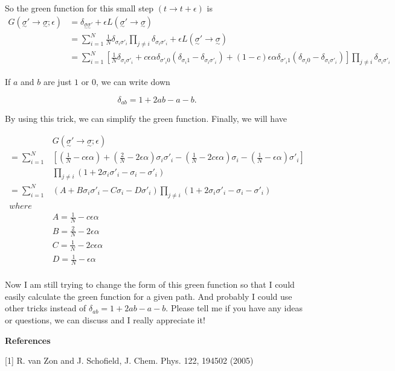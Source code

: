 \documentclass[letterpaper,12pt]{article}
\begin{document}
So the green function for this small step $(t \rightarrow t+\epsilon )$  is
\[
\begin{aligned}
 G(\underset{\sim}{\sigma}' \rightarrow \underset{\sim}{\sigma} ; \epsilon)&=\delta_{\underset{\sim}{\sigma} \underset{\sim}{\sigma}'}+\epsilon L(\underset{\sim}{\sigma}'\rightarrow\underset{\sim}{\sigma})\\ 
 &=\sum\limits_{i=1}^N \frac{1}{N} \delta_{\sigma_i \sigma'_i} \underset{j \neq i}{\prod}\delta_{\sigma_i \sigma'_i} +\epsilon L(\underset{\sim}{\sigma}'\rightarrow\underset{\sim}{\sigma})\\
 &=\sum\limits_{i=1}^N \left[ \frac{1}{N} \delta_{\sigma_i \sigma'_i} +c\epsilon\alpha \delta_{\sigma'_i 0} (\delta_{\sigma_i 1}-\delta_{\sigma_i \sigma'_i })+(1-c)\epsilon\alpha \delta_{\sigma'_i 1}(\delta_{\sigma_i 0}-\delta_{\sigma_i \sigma'_i})\right] \underset{j \neq i}{\prod}\delta_{\sigma_i \sigma'_i}
\end{aligned}
 \]

If $a$ and $b$ are just $1$ or $0$, we can write down

\[
\delta_{ab}=1+2ab-a-b.
\]

By using this trick, we can simplify the green function. Finally, we will have

\[
\left.
\begin{aligned}
&G(\underset{\sim}{\sigma}' \rightarrow \underset{\sim}{\sigma} ; \epsilon)\\
=\sum\limits_{i=1}^N& \left[ \left(\frac{1}{N}-c\epsilon\alpha \right) + \left( \frac{2}{N}-2\epsilon\alpha \right) \sigma_i\sigma'_i - \left( \frac{1}{N} - 2c\epsilon \alpha \right) \sigma_i - \left( \frac{1}{N}- \epsilon\alpha \right) \sigma'_i \right]  \\
&\underset{j \neq i}{\prod} \left(1+2\sigma_i\sigma'_i-\sigma_i-\sigma'_i \right) \\
=\sum\limits_{i=1}^N &(A+B\sigma_i\sigma'_i-C\sigma_i-D\sigma'_i) \underset{j \neq i}{\prod} (1+2\sigma_i\sigma'_i-\sigma_i-\sigma'_i)\\
where\\
&A=\frac{1}{N}-c\epsilon\alpha\\
&B=\frac{2}{N}-2\epsilon\alpha\\
&C=\frac{1}{N} - 2c\epsilon \alpha\\
&D=\frac{1}{N}- \epsilon\alpha\\
\end{aligned}
\right.
\]


Now I am still trying to change the form of this green function so that I could easily calculate the green function for a given path. And probably I could use other tricks instead of $\delta_{ab}=1+2ab-a-b$. Please tell me if you have any ideas or questions, we can discuss and I really appreciate it!
\bigskip

\noindent\textbf{References}

[1]  R. van Zon and J. Schofield, J. Chem. Phys. 122, 194502 (2005)
\end{document}
